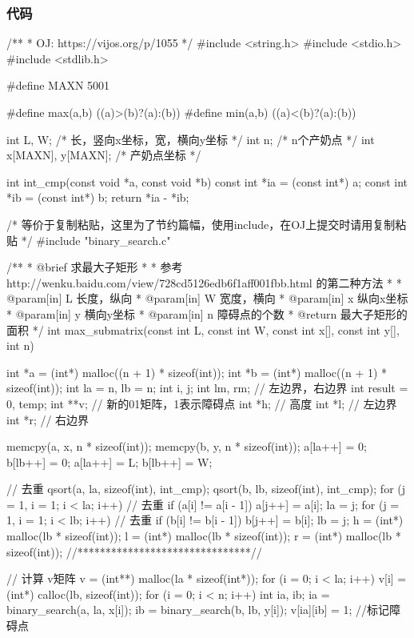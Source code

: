 \subsubsection{代码}
\begin{Codex}[label=cow_bath.c]
/**
 * OJ: https://vijos.org/p/1055
 */
#include <string.h>
#include <stdio.h>
#include <stdlib.h>

#define MAXN 5001

#define max(a,b) ((a)>(b)?(a):(b))
#define min(a,b) ((a)<(b)?(a):(b))

int L, W; /* 长，竖向x坐标，宽，横向y坐标 */
int n; /* n个产奶点 */
int x[MAXN], y[MAXN]; /* 产奶点坐标 */

int int_cmp(const void *a, const void *b) {
    const int *ia = (const int*) a;
    const int *ib = (const int*) b;
    return *ia - *ib;
}

/* 等价于复制粘贴，这里为了节约篇幅，使用include，在OJ上提交时请用复制粘贴 */
#include "binary_search.c"

/**
 * @brief 求最大子矩形
 *
 * 参考 http://wenku.baidu.com/view/728cd5126edb6f1aff001fbb.html 的第二种方法
 *
 * @param[in] L 长度，纵向
 * @param[in] W 宽度，横向
 * @param[in] x 纵向x坐标
 * @param[in] y 横向y坐标
 * @param[in] n 障碍点的个数
 * @return 最大子矩形的面积
 */
int max_submatrix(const int L, const int W,
        const int x[], const int y[], int n) {
    int *a = (int*) malloc((n + 1) * sizeof(int));
    int *b = (int*) malloc((n + 1) * sizeof(int));
    int la = n, lb = n;
    int i, j;
    int lm, rm; // 左边界，右边界
    int result = 0, temp;
    int **v;  // 新的01矩阵，1表示障碍点
    int *h;  // 高度
    int *l;  // 左边界
    int *r;  // 右边界

    memcpy(a, x, n * sizeof(int));
    memcpy(b, y, n * sizeof(int));
    a[la++] = 0;
    b[lb++] = 0;
    a[la++] = L;
    b[lb++] = W;

    // 去重
    qsort(a, la, sizeof(int), int_cmp);
    qsort(b, lb, sizeof(int), int_cmp);
    for (j = 1, i = 1; i < la; i++) { // 去重
        if (a[i] != a[i - 1])
            a[j++] = a[i];
    }
    la = j;
    for (j = 1, i = 1; i < lb; i++) { // 去重
        if (b[i] != b[i - 1])
            b[j++] = b[i];
    }
    lb = j;
    h = (int*) malloc(lb * sizeof(int));
    l = (int*) malloc(lb * sizeof(int));
    r = (int*) malloc(lb * sizeof(int));
    //*******************************//

    // 计算 v矩阵
    v = (int**) malloc(la * sizeof(int*));
    for (i = 0; i < la; i++) {
        v[i] = (int*) calloc(lb, sizeof(int));
    }
    for (i = 0; i < n; i++) {
        int ia, ib;
        ia = binary_search(a, la, x[i]);
        ib = binary_search(b, lb, y[i]);
        v[ia][ib] = 1; //标记障碍点
    }

}
\end{Codex}
